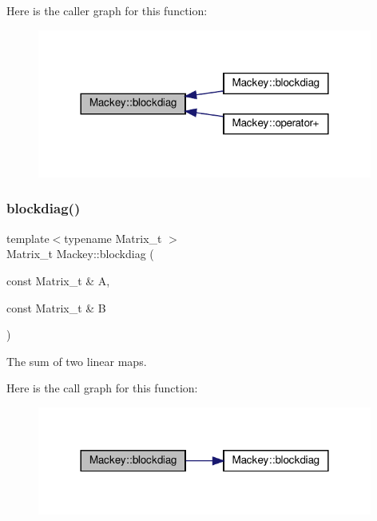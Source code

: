 Here is the caller graph for this function\+:\nopagebreak
\begin{figure}[H]
\begin{center}
\leavevmode
\includegraphics[width=312pt]{namespaceMackey_a6d2d912037da84c6884ac62db997cc0f_icgraph}
\end{center}
\end{figure}
\mbox{\label{namespaceMackey_a64d299f4b6f36e4b4e873b56a44b14b0}} 
\subsubsection{\texorpdfstring{blockdiag()}{blockdiag()}\hspace{0.1cm}{\footnotesize\ttfamily [2/2]}}
{\footnotesize\ttfamily template$<$typename Matrix\+\_\+t $>$ \\
Matrix\+\_\+t Mackey\+::blockdiag (\begin{DoxyParamCaption}\item[{const Matrix\+\_\+t \&}]{A,  }\item[{const Matrix\+\_\+t \&}]{B }\end{DoxyParamCaption})}



The sum of two linear maps. 

Here is the call graph for this function\+:\nopagebreak
\begin{figure}[H]
\begin{center}
\leavevmode
\includegraphics[width=312pt]{namespaceMackey_a64d299f4b6f36e4b4e873b56a44b14b0_cgraph}
\end{center}
\end{figure}
\mbox{\label{namespaceMackey_add5b60c8e734df2be261106e0c719f82}} 
